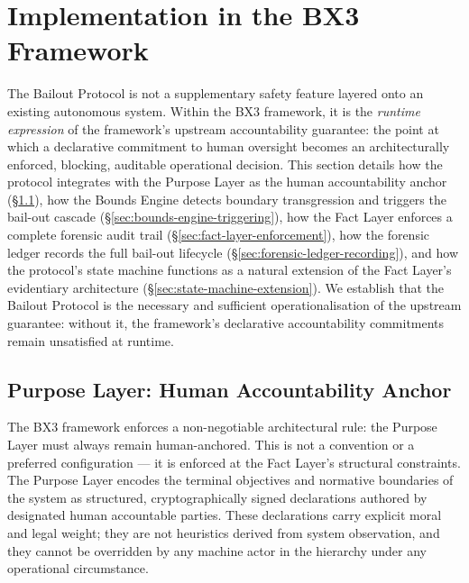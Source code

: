 
\section{Implementation in the BX3 Framework}
\label{sec:bailout-implementation}

The Bailout Protocol is not a supplementary safety feature layered onto an existing autonomous system. Within the BX3 framework, it is the \emph{runtime expression} of the framework's upstream accountability guarantee: the point at which a declarative commitment to human oversight becomes an architecturally enforced, blocking, auditable operational decision. This section details how the protocol integrates with the Purpose Layer as the human accountability anchor (\S\ref{sec:purpose-layer-anchor}), how the Bounds Engine detects boundary transgression and triggers the bail-out cascade (\S\ref{sec:bounds-engine-triggering}), how the Fact Layer enforces a complete forensic audit trail (\S\ref{sec:fact-layer-enforcement}), how the forensic ledger records the full bail-out lifecycle (\S\ref{sec:forensic-ledger-recording}), and how the protocol's state machine functions as a natural extension of the Fact Layer's evidentiary architecture (\S\ref{sec:state-machine-extension}). We establish that the Bailout Protocol is the necessary and sufficient operationalisation of the upstream guarantee: without it, the framework's declarative accountability commitments remain unsatisfied at runtime.

\subsection{Purpose Layer: Human Accountability Anchor}
\label{sec:purpose-layer-anchor}

The BX3 framework enforces a non-negotiable architectural rule: the Purpose Layer must always remain human-anchored. This is not a convention or a preferred configuration — it is enforced at the Fact Layer's structural constraints. The Purpose Layer encodes the terminal objectives and normative boundaries of the system as structured, cryptographically signed declarations authored by designated human accountable parties. These declarations carry explicit moral and legal weight; they are not heuristics derived from system observation, and they cannot be overridden by any machine actor in the hierarchy under any operational circumstance.

